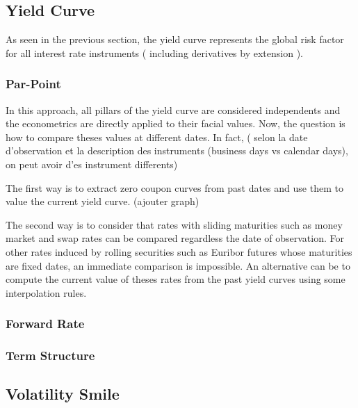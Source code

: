 \documentclass[3pt]{article}
\begin{document}
\subsection{Yield Curve}

\bigskip As seen in the previous section, the yield curve represents the
global risk factor for all interest rate instruments ( including derivatives
by extension ).

\subsubsection{Par-Point}

In this approach, all pillars of the yield curve are considered independents
and the econometrics are directly applied to their facial values. Now, the
question is how to compare theses values at different dates. In fact, (
selon la date d'observation et la description des instruments (business days
vs calendar days), on peut avoir d'es instrument differents)

\bigskip

The first way is to extract zero coupon curves from past dates and use them
to value the current yield curve. (ajouter graph)

\bigskip

\bigskip

\bigskip

The second way is to consider that rates with sliding maturities such as
money market and swap rates can be compared regardless the date of
observation. For other rates induced by rolling securities such as Euribor
futures whose maturities are fixed dates, an immediate comparison is
impossible. An alternative can be to compute the current value of theses
rates from the past yield curves using some interpolation rules.

\subsubsection{Forward Rate}

\subsubsection{Term Structure}

\subsection{Volatility Smile}

\bigskip
\end{document}
